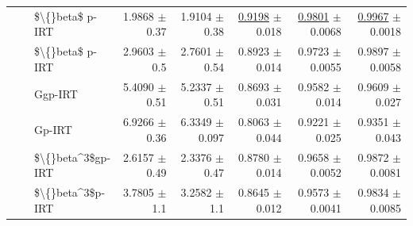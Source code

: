 \begin{longtable}{llp{}rrrrr}
 &  & \$\textbackslash\{\}beta\$ p-IRT & 1.9868 {\scriptsize $\pm$ 0.37} & 1.9104 {\scriptsize $\pm$ 0.38} & \underline{0.9198} {\scriptsize $\pm$ 0.018} & \underline{0.9801} {\scriptsize $\pm$ 0.0068} & \underline{0.9967} {\scriptsize $\pm$ 0.0018} \\
 &  & \$\textbackslash\{\}beta\$ p-IRT & 2.9603 {\scriptsize $\pm$ 0.5} & 2.7601 {\scriptsize $\pm$ 0.54} & 0.8923 {\scriptsize $\pm$ 0.014} & 0.9723 {\scriptsize $\pm$ 0.0055} & 0.9897 {\scriptsize $\pm$ 0.0058} \\
 &  & Ggp-IRT & 5.4090 {\scriptsize $\pm$ 0.51} & 5.2337 {\scriptsize $\pm$ 0.51} & 0.8693 {\scriptsize $\pm$ 0.031} & 0.9582 {\scriptsize $\pm$ 0.014} & 0.9609 {\scriptsize $\pm$ 0.027} \\
 &  & Gp-IRT & 6.9266 {\scriptsize $\pm$ 0.36} & 6.3349 {\scriptsize $\pm$ 0.097} & 0.8063 {\scriptsize $\pm$ 0.044} & 0.9221 {\scriptsize $\pm$ 0.025} & 0.9351 {\scriptsize $\pm$ 0.043} \\
 &  & \$\textbackslash\{\}beta\textasciicircum{}3\$gp-IRT & 2.6157 {\scriptsize $\pm$ 0.49} & 2.3376 {\scriptsize $\pm$ 0.47} & 0.8780 {\scriptsize $\pm$ 0.014} & 0.9658 {\scriptsize $\pm$ 0.0052} & 0.9872 {\scriptsize $\pm$ 0.0081} \\
 &  & \$\textbackslash\{\}beta\textasciicircum{}3\$p-IRT & 3.7805 {\scriptsize $\pm$ 1.1} & 3.2582 {\scriptsize $\pm$ 1.1} & 0.8645 {\scriptsize $\pm$ 0.012} & 0.9573 {\scriptsize $\pm$ 0.0041} & 0.9834 {\scriptsize $\pm$ 0.0085} \\
\end{longtable}
